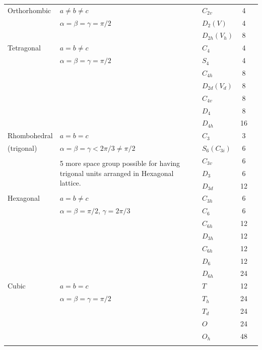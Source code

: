 \begin{landscape}
{\begin{longtable}{l|l|l|c|l}
\hline
Orthorhombic & $a\neq b\neq c$ & $C_{2v}$ & 4 & \color{red}{$3\times 4=12$}\\
\color{red}{1 different orientation} & $\alpha=\beta=\gamma=\pi/2$\qquad \color{red}{4} & $D_{2}(V)$ & 4 & \\
                                     && $D_{2h}(V_{h})$ & 8 & \\
\hline
Tetragonal & $a=b\neq c$ & $C_{4}$ & 4 & \color{red}{$7\times 2=14$}\\
\color{red}{2 different orientations} & $\alpha=\beta=\gamma=\pi/2$\qquad \color{red}{2} & $S_{4}$ & 4 & \\
                                 & & $C_{4h}$ & 8 & \\
                                 & & $D_{2d}(V_{d})$ & 8 & \\
                                 & & $C_{4v}$ & 8 & \\
                                 & & $D_{4}$ & 8 & \\
                                 & & $D_{4h}$ & 16 & \\
\hline
Rhombohedral & $a=b=c$ & $C_{3}$ & 3 & \color{red}{$5\times 1=5$}\\
(trigonal) & $\alpha=\beta=\gamma<2\pi/3\neq \pi/2$ & $S_{6}(C_{3i})$ & 6 & \\
           & \multirow{3}{5cm}{5 more space group possible for having trigonal units arranged in Hexagonal lattice.\qquad {\color{red}{1}}} & $C_{3v}$ & 6 &\\
            & & $D_{3}$ & 6 &\\
            & & $D_{3d}$ & 12 &\\
\hline
Hexagonal & $a=b\neq c$ & $C_{3h}$ & 6 & {\color{red}{$7\times 1 = 7$}}\\
\color{red}{4 different orientations} & $\alpha=\beta=\pi/2$, $\gamma=2\pi/3$\qquad {\color{red}{1}} & $C_{6}$ & 6\\
 & & $C_{6h}$ & 12 & \\
 & & $D_{3h}$ & 12 & \\
 & & $C_{6h}$ & 12 & \\
 & & $D_{6}$ & 12 & \\
 & & $D_{6h}$ & 24 & \\
\hline
Cubic & $a=b=c$ & $T$ & 12 & {\color{red}{$5\times 3=15$}}\\
      & $\alpha=\beta=\gamma=\pi/2$\qquad {\color{red}{3}} & $T_{h}$ & 24 & \\
&& $T_{d}$ & 24 & \\
&& $O$ & 24 & \\
&& $O_{h}$ & 48 & \\
\hline
\multicolumn{3}{l}{\color{red}{7 additional orientation}} & {\color{red}{Total}} & {\color{red}{61}} \\
\hline
\end{longtable}}\relax
\end{landscape}

